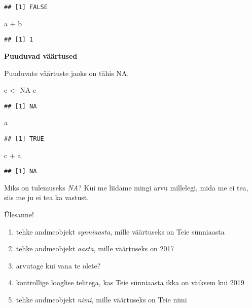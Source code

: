 \documentclass[
]{book}
\newenvironment{Shaded}{\begin{snugshade}}{\end{snugshade}}
\newcommand{\ConstantTok}[1]{\textcolor[rgb]{0.00,0.00,0.00}{#1}}
\newcommand{\NormalTok}[1]{#1}
\newcommand{\OtherTok}[1]{\textcolor[rgb]{0.56,0.35,0.01}{#1}}
\newcommand{\SpecialCharTok}[1]{\textcolor[rgb]{0.00,0.00,0.00}{#1}}
\providecommand{\tightlist}{%
  \setlength{\itemsep}{0pt}\setlength{\parskip}{0pt}}
\begin{document}
\begin{verbatim}
## [1] FALSE
\end{verbatim}

\begin{Shaded}
\begin{Highlighting}[]
\NormalTok{a }\SpecialCharTok{+}\NormalTok{ b}
\end{Highlighting}
\end{Shaded}

\begin{verbatim}
## [1] 1
\end{verbatim}

\textbf{Puuduvad väärtused}

Puuduvate väärtuste jaoks on tähis NA.

\begin{Shaded}
\begin{Highlighting}[]
\NormalTok{c }\OtherTok{\textless{}{-}} \ConstantTok{NA}
\NormalTok{c}
\end{Highlighting}
\end{Shaded}

\begin{verbatim}
## [1] NA
\end{verbatim}

\begin{Shaded}
\begin{Highlighting}[]
\NormalTok{a}
\end{Highlighting}
\end{Shaded}

\begin{verbatim}
## [1] TRUE
\end{verbatim}

\begin{Shaded}
\begin{Highlighting}[]
\NormalTok{c }\SpecialCharTok{+}\NormalTok{ a}
\end{Highlighting}
\end{Shaded}

\begin{verbatim}
## [1] NA
\end{verbatim}

Miks on tulemuseks \emph{NA}? Kui me liidame mingi arvu millelegi, mida me ei tea, siis me ju ei tea ka vastust.

Ülesanne!

\begin{enumerate}
\def\labelenumi{\arabic{enumi}.}
\tightlist
\item
  tehke andmeobjekt \emph{synniaasta}, mille väärtuseks on Teie sünniaasta
\item
  tehke andmeobjekt \emph{aasta}, mille väärtuseks on 2017
\item
  arvutage kui vana te olete?
\item
  kontrollige looglise tehtega, kas Teie sünniaasta ikka on väiksem kui 2019
\item
  tehke andmeobjekt \emph{nimi}, mille väärtuseks on Teie nimi
\end{enumerate}
\end{document}
